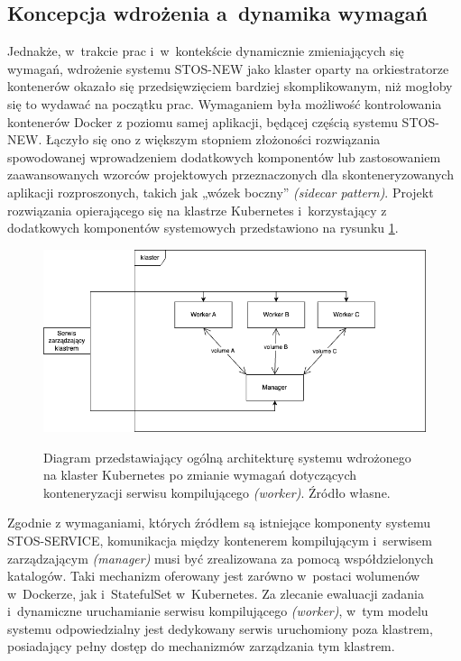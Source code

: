 \subsection{Koncepcja wdrożenia a~dynamika wymagań}
Jednakże, w~trakcie prac i~w~kontekście dynamicznie zmieniających się wymagań, wdrożenie systemu STOS-NEW jako klaster oparty na orkiestratorze kontenerów okazało się przedsięwzięciem bardziej skomplikowanym, niż mogłoby się to wydawać na początku prac. Wymaganiem była możliwość kontrolowania kontenerów Docker z poziomu samej aplikacji, będącej częścią systemu STOS-NEW. Łączyło się ono z większym stopniem złożoności rozwiązania spowodowanej wprowadzeniem dodatkowych komponentów lub zastosowaniem zaawansowanych wzorców projektowych przeznaczonych dla skonteneryzowanych aplikacji rozproszonych, takich jak „wózek boczny” \textit{(sidecar pattern)}\cite{k8sPatterns}. Projekt rozwiązania opierającego się na klastrze Kubernetes i~korzystający z dodatkowych komponentów systemowych przedstawiono na rysunku \ref{diagramk8sFinal}.

\begin{figure}[!h]
	\begin{center}
		\resizebox{0.7\textwidth}{!} {
			\includegraphics{img/4/k8sFinal.png}
		}
		\caption[Diagram prototypu klastra Kubernetes po zmianie architektury]{Diagram przedstawiający ogólną architekturę systemu wdrożonego na klaster Kubernetes po zmianie wymagań dotyczących konteneryzacji serwisu kompilującego \textit{(worker)}. Źródło własne.}
		\label{diagramk8sFinal}
	\end{center}
\end{figure}

Zgodnie z wymaganiami, których źródłem są istniejące komponenty systemu STOS-SERVICE, komunikacja między kontenerem kompilującym i~serwisem zarządzającym \textit{(manager)} musi być zrealizowana za pomocą współdzielonych katalogów. Taki mechanizm oferowany jest zarówno w~postaci wolumenów w~Dockerze\cite{dockerVolume}, jak i~StatefulSet w~Kubernetes\cite{k8sStateful}. Za zlecanie ewaluacji zadania i~dynamiczne uruchamianie serwisu kompilującego \textit{(worker)}, w~tym modelu systemu odpowiedzialny jest dedykowany serwis uruchomiony poza klastrem, posiadający pełny dostęp do mechanizmów zarządzania tym klastrem.

